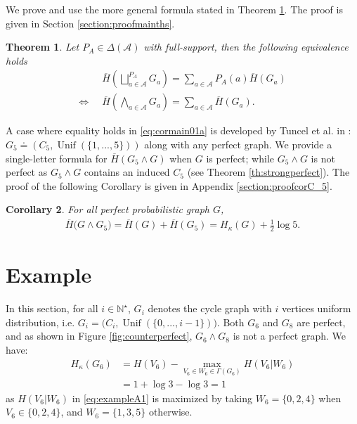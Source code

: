 \documentclass[conference,a4paper]{IEEEtran}
\DeclareMathOperator*{\Unif}{Unif}
\newtheorem{theorem}{Theorem}[section]
\newtheorem{corollary}[theorem]{Corollary}
\begin{document}
We prove and use the more general formula stated in Theorem \ref{th:caraclin}. The proof is given in Section \ref{section:proofmainths}.

\begin{theorem}\label{th:caraclin}
    Let $P_A \in \Delta(\mathcal{A})$ with full-support, then the following equivalence holds
    \begin{align}
        & \overline{H}\left(\bigsqcup_{a \in \mathcal{A}}^{P_A} G_a\right) = \sum_{a \in \mathcal{A}} P_A(a) \overline{H}(G_a) \label{eq:cormain01a} \\
        \Longleftrightarrow \;\; & \overline{H}\left(\bigwedge_{a \in \mathcal{A}} G_a\right) = \sum_{a \in \mathcal{A}} \overline{H}(G_a). \label{eq:cormain01b}
    \end{align}
\end{theorem}

A case where equality holds in \eqref{eq:cormain01a} is developed by Tuncel et al. in \cite[Lemma 3]{tuncel2009complementary}: $G_5 \doteq (C_5, \Unif(\lbrace 1, ..., 5\rbrace))$ along with any perfect graph. We provide a single-letter formula for $\overline{H}(G_5 \wedge G)$ when $G$ is perfect; while $G_5 \wedge G$ is not perfect as $G_5 \wedge G$ contains an induced $C_5$ (see Theorem \ref{th:strongperfect}). The proof of the following Corollary is given in Appendix \ref{section:proofcorC_5}.

\begin{corollary}\label{cor:C_5}
    For all perfect probabilistic graph $G$, 
    \begin{align}
        \overline{H}\big(G \wedge G_5) = \overline{H}(G) + \overline{H}(G_5) = H_\kappa(G) + \textstyle\frac{1}{2}\log 5.
    \end{align}
\end{corollary}

\section{Example}\label{section:example}

In this section, for all $i \in \mathbb{N}^\star$, $G_i$ denotes the cycle graph with $i$ vertices uniform distribution, i.e. $G_i = \big(C_i, \Unif(\lbrace 0, ..., i-1\rbrace)\big)$. Both $G_6$ and $G_8$ are perfect, and as shown in Figure \ref{fig:counterperfect}, $G_6 \wedge G_8$ is not a perfect graph. We have:
\begin{align}
    H_\kappa(G_6) & = H(V_6) - \max_{V_6 \in W_6 \in \Gamma(G_6)} H(V_6|W_6)\label{eq:exampleA1} \\
    & = 1 + \log 3 - \log 3 = 1
\end{align}
as $H(V_6|W_6)$ in
\eqref{eq:exampleA1} is maximized by taking $W_6 = \lbrace 0,2,4 \rbrace$ when $V_6 \in \lbrace 0,2,4 \rbrace$, and $W_6 = \lbrace 1,3,5 \rbrace$ otherwise.
\end{document}
